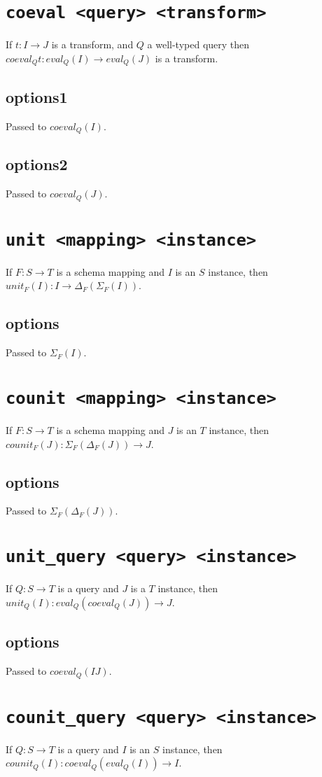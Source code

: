 \documentclass[10pt]{book}
\begin{document}
\section{{\tt coeval <query> <transform>}}
If $t : I \to J$ is a transform, and $Q$ a well-typed query then $coeval_Qt : eval_Q(I) \to eval_Q(J)$ is a transform.
\subsection{options1}
Passed to $coeval_Q(I)$.
\subsection{options2}
Passed to $coeval_Q(J)$.

\section{{\tt unit <mapping> <instance>}}
If $F : S \to T$ is a schema mapping and $I$ is an $S$ instance, then $unit_F(I) : I \to \Delta_F(\Sigma_F(I))$.
\subsection{options}
Passed to $\Sigma_F(I)$.

\section{{\tt counit <mapping> <instance>}}
If $F : S \to T$ is a schema mapping and $J$ is an $T$ instance, then $counit_F(J) : \Sigma_F(\Delta_F(J))  \to J$.
\subsection{options}
Passed to $\Sigma_F(\Delta_F(J))$.

\section{{\tt unit\_query <query> <instance>}}
If $Q : S \to T$ is a query and $J$ is a $T$ instance, then $unit_Q(I) : eval_Q(coeval_Q(J)) \to J$.
\subsection{options}
Passed to $coeval_Q(IJ)$.

\section{{\tt counit\_query <query> <instance>}}
If $Q : S \to T$ is a query and $I$ is an $S$ instance, then $counit_Q(I) : coeval_Q(eval_Q(I))  \to I$.
\end{document}

